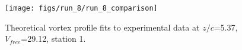\begin{figure}[H]
\centering
\texttt{[image: figs/run\_8/run\_8\_comparison]}
\caption{Theoretical vortex profile fits to experimental data at $z/c$=5.37, $V_{free}$=29.12, station 1.}
\label{fig:run_8_comparison}
\end{figure}


